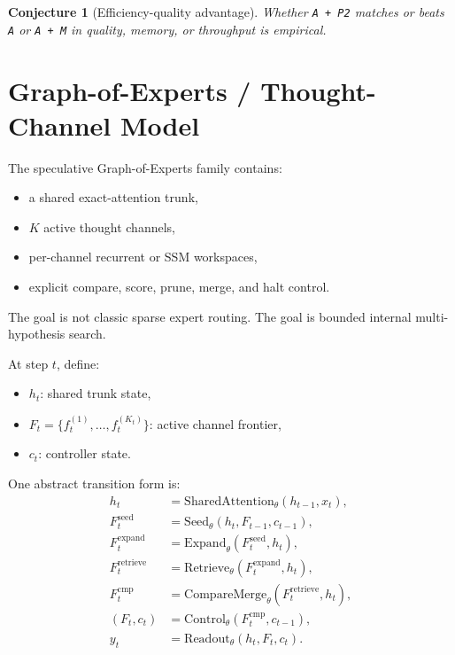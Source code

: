 \documentclass[11pt]{article}
\newtheorem{conjecture}[definition]{Conjecture}
\begin{document}
\begin{conjecture}[Efficiency-quality advantage]
Whether \texttt{A + P2} matches or beats \texttt{A} or \texttt{A + M} in
quality, memory, or throughput is empirical.
\end{conjecture}

\section{Graph-of-Experts / Thought-Channel Model}

The speculative Graph-of-Experts family contains:
\begin{itemize}
  \item a shared exact-attention trunk,
  \item $K$ active thought channels,
  \item per-channel recurrent or SSM workspaces,
  \item explicit compare, score, prune, merge, and halt control.
\end{itemize}

The goal is not classic sparse expert routing.
The goal is bounded internal multi-hypothesis search.

At step $t$, define:
\begin{itemize}
  \item $h_t$: shared trunk state,
  \item $F_t = \{f_t^{(1)}, \dots, f_t^{(K_t)}\}$: active channel frontier,
  \item $c_t$: controller state.
\end{itemize}

One abstract transition form is:
\begin{align}
  h_t &= \mathrm{SharedAttention}_\theta(h_{t-1}, x_t), \\
  F_t^{\mathrm{seed}} &= \mathrm{Seed}_\theta(h_t, F_{t-1}, c_{t-1}), \\
  F_t^{\mathrm{expand}} &= \mathrm{Expand}_\theta(F_t^{\mathrm{seed}}, h_t), \\
  F_t^{\mathrm{retrieve}} &= \mathrm{Retrieve}_\theta(F_t^{\mathrm{expand}}, h_t), \\
  F_t^{\mathrm{cmp}} &= \mathrm{CompareMerge}_\theta(F_t^{\mathrm{retrieve}}, h_t), \\
  (F_t, c_t) &= \mathrm{Control}_\theta(F_t^{\mathrm{cmp}}, c_{t-1}), \\
  y_t &= \mathrm{Readout}_\theta(h_t, F_t, c_t).
\end{align}
\end{document}
